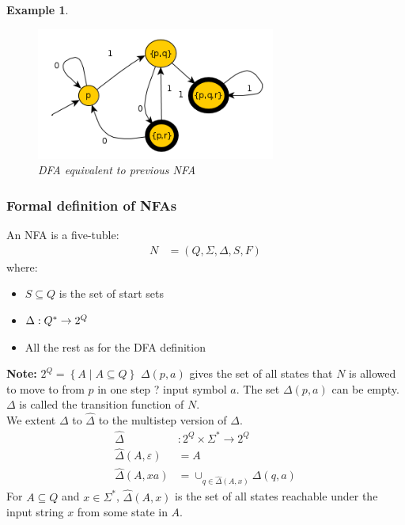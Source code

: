 \documentclass[a4paper]{article}
\newtheorem{example}{Example}
\begin{document}
\begin{example}
    \begin{figure}[H]
        \centering
        \includegraphics[width=0.7\textwidth]{example-5-2.png}
        \caption{DFA equivalent to previous NFA}
    \end{figure}
\end{example}
    \subsubsection{Formal definition of NFAs}
    An NFA is a five-tuble:
    \begin{align*}
        N&=\left( Q,\Sigma,\Delta,S,F \right)
    \end{align*}
    where:
    \begin{itemize}
        \item $S\subseteq Q$ is the set of start sets
        \item $\Delta: Q\time\Sigma^*\rightarrow 2^Q$
        \item All the rest as for the DFA definition
    \end{itemize}
    \textbf{Note:} $2^Q=\left\{ A\middle | A\subseteq Q \right\}$
        $\Delta(p,a)$ gives the set of all states that $N$ is allowed
        to move to from $p$ in one step ? input symbol $a$. The set $\Delta(p,a)$
        can be empty.\\
        $\Delta$ is called the transition function of $N$.
        \\We extent $\Delta$ to $\hat{\Delta}$ to the multistep version of $\Delta$.
        \begin{align*}
            \hat{\Delta}&:2^Q\times \Sigma^* \rightarrow 2^Q\\
            \hat{\Delta}(A,\varepsilon)&=A\\
            \hat{\Delta}(A,xa)&=\cup_{q\in\hat{\Delta}(A,x)}\Delta(q,a)
        \end{align*}
        For $A\subseteq Q$ and $x\in\Sigma^*$, $\hat{\Delta}(A,x)$ is the set
        of all states reachable under the input string $x$ from some state in $A$.
\end{document}
